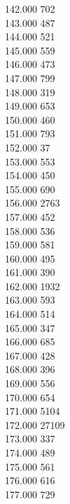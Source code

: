 { 142.000	702 \\
 143.000	487 \\
 144.000	521 \\
 145.000	559 \\
 146.000	473 \\
 147.000	799 \\
 148.000	319 \\
 149.000	653 \\
 150.000	460 \\
 151.000	793 \\
 152.000	37 \\
 153.000	553 \\
 154.000	450 \\
 155.000	690 \\
 156.000	2763 \\
 157.000	452 \\
 158.000	536 \\
 159.000	581 \\
 160.000	495 \\
 161.000	390 \\
 162.000	1932 \\
 163.000	593 \\
 164.000	514 \\
 165.000	347 \\
 166.000	685 \\
 167.000	428 \\
 168.000	396 \\
 169.000	556 \\
 170.000	654 \\
 171.000	5104 \\
 172.000	27109 \\
 173.000	337 \\
 174.000	489 \\
 175.000	561 \\
 176.000	616 \\
 177.000	729 \\
}
